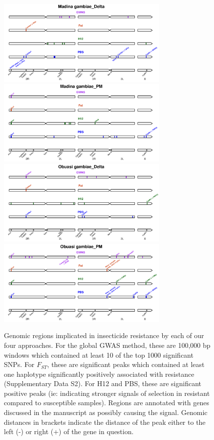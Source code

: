 \documentclass[a4paper,12pt]{article}
\begin{document}
\begin{figure}[h]
	\vskip 0.4cm
	\hspace{-0.3cm}\includegraphics*[width = 8.4cm]{../supplementary_implicated_regions/Madina_gambiae_Delta_implicated_regions.pdf}
	\hspace{-0.3cm}\includegraphics*[width = 8.4cm]{../supplementary_implicated_regions/Madina_gambiae_PM_implicated_regions.pdf}
	\vskip 0.4cm
	\hspace{-0.3cm}\includegraphics*[width = 8.4cm]{../supplementary_implicated_regions/Obuasi_gambiae_Delta_implicated_regions.pdf}
	\hspace{-0.3cm}\includegraphics*[width = 8.4cm]{../supplementary_implicated_regions/Obuasi_gambiae_PM_implicated_regions.pdf}
	\caption{\footnotesize Genomic regions implicated in insecticide resistance by each of our four approaches. For the global GWAS method, these are 100,000 bp windows which contained at least 10 of the top 1000 significant SNPs. For $F_{ST}$, these are significant peaks which contained at least one haplotype significantly positively associated with resistance (Supplementary Data S2). For H12 and PBS, these are significant positive peaks (ie: indicating stronger signals of selection in resistant compared to susceptible samples). Regions are annotated with genes discussed in the manuscript as possibly causing the signal. Genomic distances in brackets indicate the distance of the peak either to the left (-) or right (+) of the gene in question.}
	\label{FigS5}
\end{figure}
\end{document}
